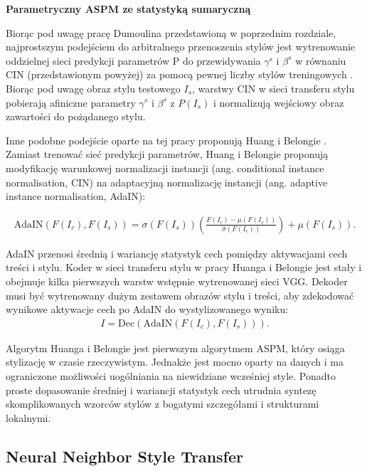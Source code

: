 \documentclass[12pt]{article}
\begin{document}
\noindent\textbf{Parametryczny ASPM ze statystyką sumaryczną}

Biorąc pod uwagę pracę Dumoulina przedstawioną w poprzednim rozdziale, najprostszym podejściem do arbitralnego przenoszenia stylów jest wytrenowanie oddzielnej sieci predykcji parametrów P do przewidywania $\gamma^s$ i $\beta^s$ w równaniu CIN (przedstawionym powyżej) za pomocą pewnej liczby stylów treningowych \cite{48}. Biorąc pod uwagę obraz stylu testowego $I_s$, warstwy CIN w sieci transferu stylu pobierają afiniczne parametry $\gamma^s$ i $\beta^s$ z $P(I_s)$ i normalizują wejściowy obraz zawartości do pożądanego stylu.

Inne podobne podejście oparte na tej pracy proponują Huang i Belongie \cite{49}. Zamiast trenować sieć predykcji parametrów, Huang i Belongie proponują modyfikację warunkowej normalizacji instancji (ang. conditional instance normalisation, CIN) na adaptacyjną normalizację instancji (ang. adaptive instance normalisation, AdaIN):

\begin{align*}
    \text{AdaIN}\left(F\left(I_c\right),F\left(I_s\right)\right) = \sigma\left(F\left(I_s\right)\right)\left(\frac{F\left(I_c\right)-\mu\left(F\left(I_c\right)\right)}{\sigma\left(F\left(I_c\right)\right)}\right)+\mu\left(F\left(I_s\right)\right).
\end{align*}

AdaIN przenosi średnią i wariancję statystyk cech pomiędzy aktywacjami cech treści i stylu. Koder w sieci transferu stylu w pracy Huanga i Belongie jest stały i obejmuje kilka pierwszych warstw wstępnie wytrenowanej sieci VGG. Dekoder musi być wytrenowany dużym zestawem obrazów stylu i treści, aby zdekodować wynikowe aktywacje cech po AdaIN do wystylizowanego wyniku:
\begin{align*}
    I = \text{Dec}\left( \text{AdaIN}\left(F\left(I_c\right), F\left(I_s\right)\right)\right).
\end{align*}

Algorytm Huanga i Belongie jest pierwszym algorytmem ASPM, który osiąga stylizację w czasie rzeczywistym. Jednakże jest mocno oparty na danych i ma ograniczone możliwości uogólniania na niewidziane wcześniej style. Ponadto proste dopasowanie średniej i wariancji statystyk cech utrudnia syntezę skomplikowanych wzorców stylów z bogatymi szczegółami i strukturami lokalnymi.

\subsection{Neural Neighbor Style Transfer}
\end{document}
